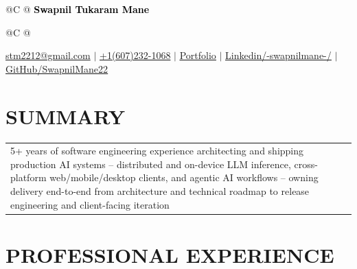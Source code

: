 \documentclass[a4paper,10pt]{extarticle}
\begin{document}
\pagestyle{empty}

\begin{tabularx}{\linewidth}{@{}C @{}}
{\fontsize{16}{16} \textcolor{black}{\textbf{{Swapnil Tukaram Mane}}}}
\end{tabularx}

\vspace{-2pt}

\begin{tabularx}{\linewidth}{@{}C @{}}

{\href{mailto:stm2212@gmail.com}{\raisebox{0\height} stm2212@gmail.com}} $|$ \href{tel:+16072321068}{\raisebox{0\height}+1(607)232-1068} $|$
\textcolor[HTML]{000000}
{\uline{\href{https://swapnilmane22.github.io/portfolio/}{\raisebox{-0.05\height} Portfolio}} $|$}
\textcolor[HTML]{000000}{\uline{\href{https://www.linkedin.com/in/-swapnilmane-/}{\raisebox{-0.05\height} Linkedin/-swapnilmane-/}} $|$}
\textcolor[HTML]{000000}{\uline{\href{https://github.com/SwapnilMane22}{\raisebox{-0.05\height} GitHub/SwapnilMane22}}}
\end{tabularx}

\vspace{4pt}

\section*{SUMMARY}
\vspace{4pt}
\begin{tabularx}{\linewidth}{@{}X@{}}
5+ years of software engineering experience architecting and shipping production AI systems -- distributed and on-device LLM inference, cross-platform web/mobile/desktop clients, and agentic AI workflows -- owning delivery end-to-end from architecture and technical roadmap to release engineering and client-facing iteration
\end{tabularx}

\vspace{4pt}

\section{{PROFESSIONAL EXPERIENCE}}
\vspace{4pt}
\end{document}
